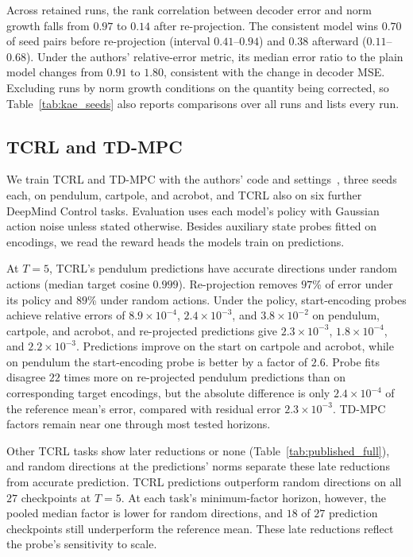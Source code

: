 Across retained runs, the rank correlation between decoder error and norm growth falls from $0.97$ to $0.14$ after re-projection. The consistent model wins $0.70$ of seed pairs before re-projection (interval $0.41$--$0.94$) and $0.38$ afterward ($0.11$--$0.68$). Under the authors' relative-error metric, its median error ratio to the plain model changes from $0.91$ to $1.80$, consistent with the change in decoder MSE. Excluding runs by norm growth conditions on the quantity being corrected, so Table~\ref{tab:kae_seeds} also reports comparisons over all runs and lists every run.



\subsection{TCRL and TD-MPC}
\label{app:problem}
We train TCRL and TD-MPC with the authors' code and settings~\citep{zhao2023simplified,hansen2022temporal}, three seeds each, on pendulum, cartpole, and acrobot, and TCRL also on six further DeepMind Control tasks. Evaluation uses each model's policy with Gaussian action noise unless stated otherwise. Besides auxiliary state probes fitted on encodings, we read the reward heads the models train on predictions.

At $T=5$, TCRL's pendulum predictions have accurate directions under random actions (median target cosine $0.999$). Re-projection removes $97$\% of error under its policy and $89$\% under random actions. Under the policy, start-encoding probes achieve relative errors of $8.9\times10^{-4}$, $2.4\times10^{-3}$, and $3.8\times10^{-2}$ on pendulum, cartpole, and acrobot, and re-projected predictions give $2.3\times10^{-3}$, $1.8\times10^{-4}$, and $2.2\times10^{-3}$. Predictions improve on the start on cartpole and acrobot, while on pendulum the start-encoding probe is better by a factor of $2.6$. Probe fits disagree $22$ times more on re-projected pendulum predictions than on corresponding target encodings, but the absolute difference is only $2.4\times10^{-4}$ of the reference mean's error, compared with residual error $2.3\times10^{-3}$. TD-MPC factors remain near one through most tested horizons.

Other TCRL tasks show later reductions or none (Table~\ref{tab:published_full}), and random directions at the predictions' norms separate these late reductions from accurate prediction. TCRL predictions outperform random directions on all $27$ checkpoints at $T=5$. At each task's minimum-factor horizon, however, the pooled median factor is lower for random directions, and $18$ of $27$ prediction checkpoints still underperform the reference mean. These late reductions reflect the probe's sensitivity to scale.

